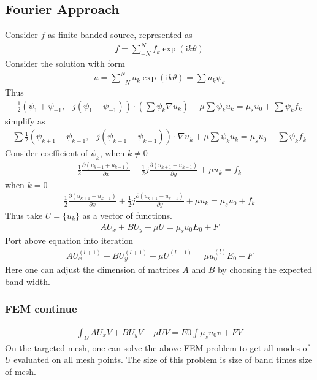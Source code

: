 \documentclass[12pt,a4paper]{article}
\begin{document}
\subsection{Fourier Approach}
Consider $f$ as finite banded source, represented as 
\begin{eqnarray}
f = \sum_{-N}^{N} f_k \exp({\mathrm{i}k\theta})
\end{eqnarray}
Consider the solution with form 
\begin{eqnarray}
u = \sum_{-N}^{N} u_k \exp({\mathrm{i}k\theta}) =\sum u_k\psi_k
\end{eqnarray}
Thus
\begin{eqnarray}
\frac{1}{2}(\psi_1 + \psi_{-1}, -j(\psi_1 - \psi_{-1}))\cdot (\sum \psi_k\nabla u_k) + \mu \sum \psi_k u_k = \mu_s u_0 + \sum \psi_k f_k
\end{eqnarray}
simplify as
\begin{eqnarray}
\sum \frac{1}{2}(\psi_{k+1}+\psi_{k-1}, -j(\psi_{k+1} - \psi_{k-1}))\cdot \nabla u_k + \mu \sum \psi_k u_k = \mu_s u_0 + \sum \psi_k f_k
\end{eqnarray}
Consider coefficient of $\psi_k$, when $k\neq 0$
\begin{eqnarray}
\frac{1}{2} \frac{\partial (u_{k+1} + u_{k-1})}{\partial x} + \frac{1}{2}j \frac{\partial (u_{k+1} - u_{k-1})}{\partial y} + \mu u_k = f_k
\end{eqnarray}
when $k=0$
\begin{eqnarray}
\frac{1}{2} \frac{\partial (u_{k+1} + u_{k-1})}{\partial x} + \frac{1}{2}j \frac{\partial (u_{k+1} - u_{k-1})}{\partial y} + \mu u_k = \mu_s u_0 +f_k
\end{eqnarray}
Thus take $U = \{u_k\}$ as a vector of functions.
\begin{eqnarray}
A U_x+ B U_y + \mu U = \mu_s u_0 E_0 + F
\end{eqnarray}
Port above equation into iteration
\begin{eqnarray}
A U_x^{(l+1)} + B U_y^{(l+1)} + \mu U^{(l+1)} = \mu u^{(l)}_0 E_0 + F
\end{eqnarray}
Here one can adjust the dimension of matrices $A$ and $B$ by choosing the expected band width.
\subsubsection{FEM continue}
\begin{eqnarray}
\int_{\Omega} A U_x V + B U_y V + \mu UV = E0\int \mu_s u_0 v + FV 
\end{eqnarray}
On the targeted mesh, one can solve the above FEM problem to get all modes of $U$ evaluated on all mesh points. The size of this problem is size of band times size of mesh. 
\end{document}
